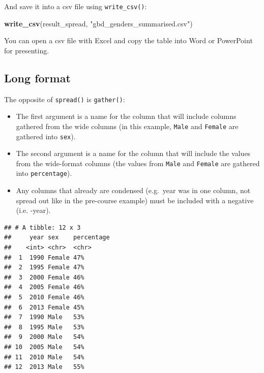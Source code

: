\documentclass[]{book}
\makeatletter
\newenvironment{Shaded}{\begin{snugshade}}{\end{snugshade}}
\newcommand{\KeywordTok}[1]{\textcolor[rgb]{0.13,0.29,0.53}{\textbf{#1}}}
\newcommand{\NormalTok}[1]{#1}
\newcommand{\OperatorTok}[1]{\textcolor[rgb]{0.81,0.36,0.00}{\textbf{#1}}}
\newcommand{\StringTok}[1]{\textcolor[rgb]{0.31,0.60,0.02}{#1}}
\providecommand{\tightlist}{%
  \setlength{\itemsep}{0pt}\setlength{\parskip}{0pt}}
\newenvironment{kframe}{%
\medskip{}
\setlength{\fboxsep}{.8em}
 \def\at@end@of@kframe{}%
 \ifinner\ifhmode%
  \def\at@end@of@kframe{\end{minipage}}%
  \begin{minipage}{\columnwidth}%
 \fi\fi%
 \def\FrameCommand##1{\hskip\@totalleftmargin \hskip-\fboxsep
 \colorbox{shadecolor}{##1}\hskip-\fboxsep
     \hskip-\linewidth \hskip-\@totalleftmargin \hskip\columnwidth}%
 \MakeFramed {\advance\hsize-\width
   \@totalleftmargin\z@ \linewidth\hsize
   \@setminipage}}%
 {\par\unskip\endMakeFramed%
 \at@end@of@kframe}
\renewenvironment{Shaded}{\begin{kframe}}{\end{kframe}}
\theoremstyle{definition}
\theoremstyle{definition}
\theoremstyle{definition}
\theoremstyle{remark}
\makeatother
\begin{document}
And save it into a csv file using \texttt{write\_csv()}:

\begin{Shaded}
\begin{Highlighting}[]
\KeywordTok{write_csv}\NormalTok{(result_spread, }\StringTok{"gbd_genders_summarised.csv"}\NormalTok{)}
\end{Highlighting}
\end{Shaded}

You can open a csv file with Excel and copy the table into Word or
PowerPoint for presenting.

\hypertarget{long-format}{%
\subsection{Long format}\label{long-format}}

The opposite of \texttt{spread()} is \texttt{gather()}:

\begin{itemize}
\tightlist
\item
  The first argument is a name for the column that will include columns
  gathered from the wide columns (in this example, \texttt{Male} and
  \texttt{Female} are gathered into \texttt{sex}).
\item
  The second argument is a name for the column that will include the
  values from the wide-format columns (the values from \texttt{Male} and
  \texttt{Female} are gathered into \texttt{percentage}).
\item
  Any columns that already are condensed (e.g.~year was in one column,
  not spread out like in the pre-course example) must be included with a
  negative (i.e. -year).
\end{itemize}

\begin{Shaded}
\end{Shaded}

\begin{verbatim}
## # A tibble: 12 x 3
##     year sex    percentage
##    <int> <chr>  <chr>     
##  1  1990 Female 47%       
##  2  1995 Female 47%       
##  3  2000 Female 46%       
##  4  2005 Female 46%       
##  5  2010 Female 46%       
##  6  2013 Female 45%       
##  7  1990 Male   53%       
##  8  1995 Male   53%       
##  9  2000 Male   54%       
## 10  2005 Male   54%       
## 11  2010 Male   54%       
## 12  2013 Male   55%
\end{verbatim}
\end{document}
